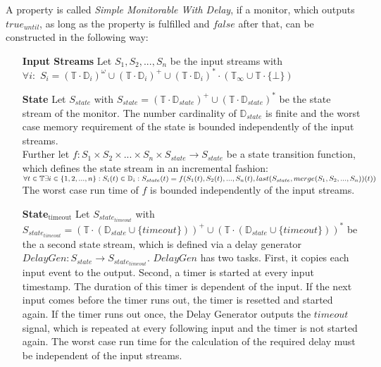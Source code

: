 	\begin{definition}
		A property is called \textit{Simple Monitorable With Delay}, if a monitor, which outputs $true_{until}$, as long as the property is fulfilled and $false$ after that, can be constructed in the following way:
		\begin{itemize}
			\item[\textbf{Input Streams}]
				Let $S_1, S_2, ..., S_n$ be the input streams with\\
				$\forall i:$ $S_i=(\mathbb{T}\cdot \mathbb{D}_i)^\omega\cup(\mathbb{T}\cdot \mathbb{D}_i)^+\cup(\mathbb{T}\cdot \mathbb{D}_i)^*\cdot(\mathbb{T}_\infty\cup\mathbb{T}\cdot\{\bot\})$
			\item[\textbf{State}]
				Let $S_{state}$ with $S_{state}= (\mathbb{T}\cdot \mathbb{D}_{state})^+\cup(\mathbb{T}\cdot \mathbb{D}_{state})^*$ be the state stream of the monitor. The number cardinality of $\mathbb{D}_{state}$ is finite and the worst case memory requirement of the state is bounded independently of the input streams.\\
				Further let $f: S_1 \times S_2 \times ... \times S_n \times S_{state}\rightarrow S_{state}$ be a state transition function, which defines the state stream in an incremental fashion:
				\begin{math}
					\forall t\in \mathbb T \exists i\in \{1,2,...,n\}: S_i(t)\in\mathbb D_i:\\
					S_{state}(t)= f(S_1(t), S_2(t), ..., S_n(t), last(S_{state}, merge(S_1, S_2, ..., S_n))(t))
				\end{math}\\
				The worst case run time of $f$ is bounded independently of the input streams.
			\item[\textbf{State$_\text{timeout}$}]
				Let $S_{state_{timeout}}$ with $S_{state_{timeout}}= (\mathbb{T}\cdot (\mathbb{D}_{state}\cup \{timeout\}))^+\cup(\mathbb{T}\cdot (\mathbb{D}_{state}\cup \{timeout\}))^*$ be the a second state stream, which is defined via a delay generator $DelayGen: S_{state}\rightarrow S_{state_{timeout}}$. $DelayGen$ has two tasks. First, it copies each input event to the output. Second, a timer is started at every input timestamp. The duration of this timer is dependent of the input. If the next input comes before the timer runs out, the timer is resetted and started again. If the timer runs out once, the Delay Generator outputs the $timeout$ signal, which is repeated at every following input and the timer is not started again. The worst case run time for the calculation of the required delay must be independent of the input streams.

\end{itemize}
\end{definition}
